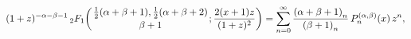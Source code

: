 \[(1+z)^{-\alpha-\beta-1}\*\mathop{{{}_{2}F_{1}}\/}\nolimits\!\left({\tfrac{1}{2%
}(\alpha+\beta+1),\tfrac{1}{2}(\alpha+\beta+2)\atop\beta+1};\frac{2(x+1)z}{(1+%
z)^{2}}\right)=\sum_{n=0}^{\infty}\frac{\left(\alpha+\beta+1\right)_{n}}{\left%
(\beta+1\right)_{n}}\mathop{P^{(\alpha,\beta)}_{n}\/}\nolimits\!\left(x\right)%
z^{n},\]